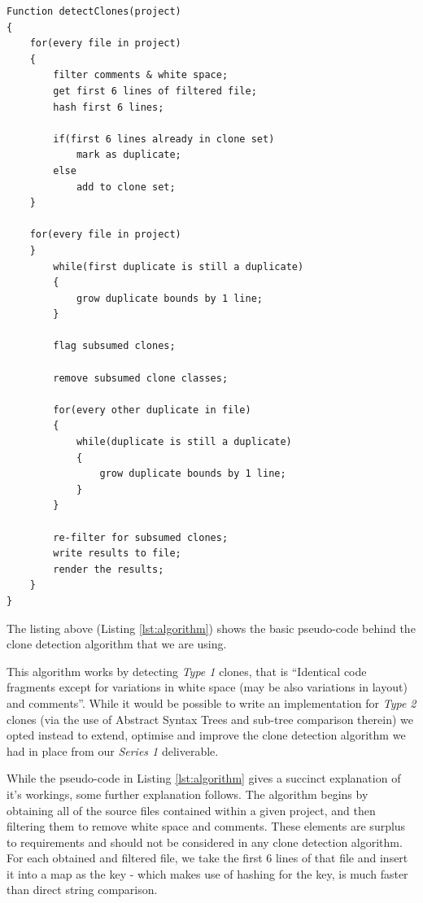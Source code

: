 \documentclass{article}
\begin{document}
\begin{lstlisting}[caption=Clone Detection Algorithm,label=lst:algorithm]
Function detectClones(project)
{
    for(every file in project)
    {
        filter comments & white space;
        get first 6 lines of filtered file;
        hash first 6 lines;
        
        if(first 6 lines already in clone set)
            mark as duplicate;
        else
            add to clone set;
    }
    
    for(every file in project)
    }
        while(first duplicate is still a duplicate)
        {
            grow duplicate bounds by 1 line;
        }
        
        flag subsumed clones;
        
        remove subsumed clone classes;
        
        for(every other duplicate in file)
        {
            while(duplicate is still a duplicate)
            {
                grow duplicate bounds by 1 line;
            }
        }
        
        re-filter for subsumed clones;
        write results to file;
        render the results;
    }
}
\end{lstlisting}

The listing above (Listing \ref{lst:algorithm}) shows the basic pseudo-code behind the clone detection algorithm that we are using.

This algorithm works by detecting \textit{Type 1} clones, that is ``Identical code fragments except for variations in white space (may be also
variations in layout) and comments''\cite{cloningsurvey}. While it would be possible to write an implementation for \textit{Type 2} clones (via the use of Abstract Syntax Trees and sub-tree comparison therein) we opted instead to extend, optimise and improve the clone detection algorithm we had in place from our \textit{Series 1} deliverable.

While the pseudo-code in Listing \ref{lst:algorithm} gives a succinct explanation of it's workings, some further explanation follows. The algorithm begins by obtaining all of the source files contained within a given project, and then filtering them to remove white space and comments. These elements are surplus to requirements and should not be considered in any clone detection algorithm. For each obtained and filtered file, we take the first 6 lines of that file and insert it into a map as the key - which makes use of hashing for the key, is much faster than direct string comparison.
\end{document}
